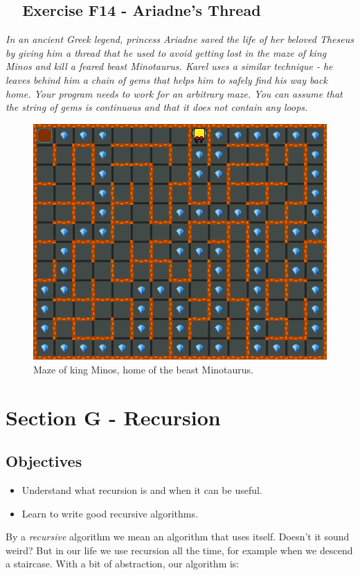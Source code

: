 {{{{\subsection{\ \ Exercise F14 - Ariadne's Thread}

{\em In an ancient Greek legend, princess Ariadne saved the life of her 
beloved Theseus by giving him a thread that he used to avoid getting lost 
in the maze of king Minos and kill a feared beast Minotaurus. Karel uses 
a similar technique - he leaves behind him a chain of gems that helps him 
to safely find his way back home. Your program needs to work for an 
arbitrary maze. You can assume that the string of gems is continuous 
and that it does not contain any loops.}\\[-7mm]

\begin{figure}[!ht]
\begin{center}
\includegraphics[height=0.4\textwidth]{imgk/f14.png}
\end{center}
\vspace{-4mm}
\caption{Maze of king Minos, home of the beast Minotaurus.}
\label{fig:f14}
\vspace{-4mm}
\end{figure}
\noindent

\newpage


\section{Section G - Recursion} \label{sec:recursion}

\subsection{Objectives} 
 
\begin{itemize}
\item Understand what recursion is and when it can be useful.
\item Learn to write good recursive algorithms.
\end{itemize}
By a {\em recursive} algorithm we mean an algorithm that uses itself. Doesn't it sound weird?
But in our life we use recursion all the time, for example when we descend a staircase.
With a bit of abstraction, our algorithm is:

}}}}
